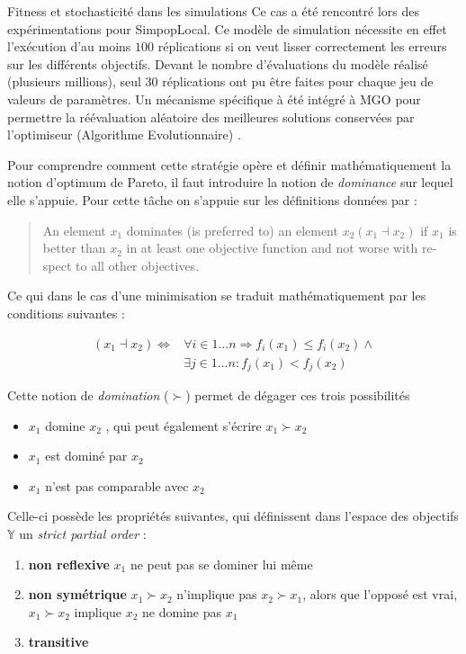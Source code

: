 \begin{testiv}{Fitness et stochasticité dans les simulations}{}
Ce cas a été rencontré lors des expérimentations pour SimpopLocal. Ce modèle de simulation nécessite en effet l'exécution d'au moins $100$ réplications si on veut lisser correctement les erreurs sur les différents objectifs. Devant le nombre d'évaluations du modèle réalisé (plusieurs millions), seul $30$ réplications ont pu être faites pour chaque jeu de valeurs de paramètres. Un mécanisme spécifique à été intégré à MGO pour permettre la réévaluation aléatoire des meilleures solutions conservées par l'optimiseur (Algorithme Evolutionnaire) \autocite[193]{Schmitt2014}.

\end{testiv}

Pour comprendre comment cette stratégie opère et définir mathématiquement la notion d'optimum de Pareto, il faut introduire la notion de \textit{dominance} sur lequel elle s'appuie. Pour cette tâche on s'appuie sur les définitions données par \textcite[65]{Weise2011} :

\foreignblockquote{english}[{\cite[65]{Weise2011}}]{An element $x_1$ dominates (is preferred to) an element $x_2 (x_1 \dashv x_2)$ if $x_1$ is better than $x_2$ in at least one objective function and not worse with respect to all other objectives.}

Ce qui dans le cas d'une minimisation se traduit mathématiquement par les conditions suivantes :

\begin{align*}
	(x_1 \dashv x_2) \Leftrightarrow &\forall i \in 1 \dotsc n \Rightarrow  f_i (x_1) \leq f_i (x_2) \land \\
	&\exists j \in 1 \dotsc n : f_j (x_1) < f_j (x_2)
\end{align*}

Cette notion de \textit{domination} ($\succ$) permet de dégager ces trois possibilités

\begin{itemize}
\item $x_1$ domine $x_2$ , qui peut également s'écrire $x_1 \succ x_2$
\item $x_1$ est dominé par $x_2$
\item $x_1$ n'est pas comparable avec $x_2$
\end{itemize}

Celle-ci possède les propriétés suivantes, qui définissent dans l'espace des objectifs $\mathbb{Y}$ un \textit{strict partial order} :

\begin{enumerate}
\item{\textbf{non reflexive}}  $x_1$ ne peut pas se dominer lui même
\item{\textbf{non symétrique}} $ x_1 \succ x_2$ n'implique pas $x_2 \succ x_1$, alors que l'opposé est vrai, $x_1 \succ x_2$ implique $x_2$ ne domine pas $x_1$
\item{\textbf{transitive} }
\end{enumerate}

